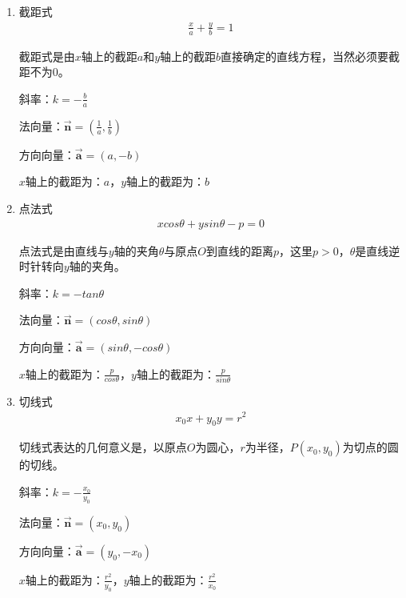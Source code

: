 \begin{enumerate}
\item 截距式
\begin{eqnarray*}
\frac{x}{a} + \frac{y}{b} = 1
\end{eqnarray*}\par
截距式是由$x$轴上的截距$a$和$y$轴上的截距$b$直接确定的直线方程，当然必须要截距不为$0$。\par
斜率：$k = - \frac{b}{a}$\par
法向量：$\overrightarrow{\textbf{n}}=(\frac{1}{a},\frac{1}{b})$\par
方向向量：$\overrightarrow{\textbf{a}}=(a,-b)$\par
$x$轴上的截距为：$a$，$y$轴上的截距为：$b$\par

\item 点法式
\begin{eqnarray*}
xcos\theta + ysin\theta -p=0
\end{eqnarray*}\par
点法式是由直线与$y$轴的夹角$\theta$与原点$O$到直线的距离$p$，这里$p>0$，$\theta$是直线逆时针转向$y$轴的夹角。\par
斜率：$k = -tan\theta$\par 
法向量：$\overrightarrow{\textbf{n}}=(cos\theta ,sin\theta )$\par
方向向量：$\overrightarrow{\textbf{a}}=(sin\theta ,-cos\theta )$\par
$x$轴上的截距为：$\frac{p}{cos\theta }$，$y$轴上的截距为：$\frac{p}{sin\theta }$\par

\item 切线式
\begin{eqnarray*}
x_0x+y_0y=r^2
\end{eqnarray*} \par
切线式表达的几何意义是，以原点$O$为圆心，$r$为半径，$P(x_0,y_0)$为切点的圆的切线。\par
斜率：$k = -\displaystyle{\frac{x_0}{y_0}}$\par
法向量：$\overrightarrow{\textbf{n}}=(x_0 ,y_0)$\par
方向向量：$\overrightarrow{\textbf{a}}=(y_0 ,-x_0 )$\par
$x$轴上的截距为：$\displaystyle{\frac{r^2}{y_0 }}$，$y$轴上的截距为：$\displaystyle{\frac{r^2}{x_0}}$\par


\end{enumerate}
